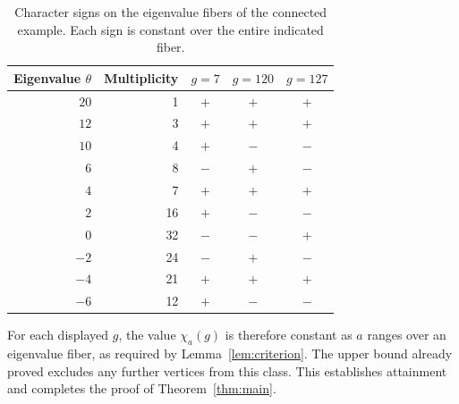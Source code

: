\documentclass[11pt]{article}
\theoremstyle{definition}
\begin{document}
\begin{table}[htbp]
\centering
\begin{tabular}{r r c c c}
\hline
Eigenvalue $\theta$ & Multiplicity & $g=7$ & $g=120$ & $g=127$\\
\hline
$20$ & 1 & $+$ & $+$ & $+$\\
$12$ & 3 & $+$ & $+$ & $+$\\
$10$ & 4 & $+$ & $-$ & $-$\\
$6$ & 8 & $-$ & $+$ & $-$\\
$4$ & 7 & $+$ & $+$ & $+$\\
$2$ & 16 & $+$ & $-$ & $-$\\
$0$ & 32 & $-$ & $-$ & $+$\\
$-2$ & 24 & $-$ & $+$ & $-$\\
$-4$ & 21 & $+$ & $+$ & $+$\\
$-6$ & 12 & $+$ & $-$ & $-$\\
\hline
\end{tabular}
\caption{Character signs on the eigenvalue fibers of the connected
example. Each sign is constant over the entire indicated fiber.}
\label{tab:signs}
\end{table}

For each displayed $g$, the value $\chi_a(g)$ is therefore constant as
$a$ ranges over an eigenvalue fiber, as required by Lemma~\ref{lem:criterion}.
The upper bound already proved excludes any further vertices from this
class. This establishes attainment and completes the proof of
Theorem~\ref{thm:main}.
\end{document}
